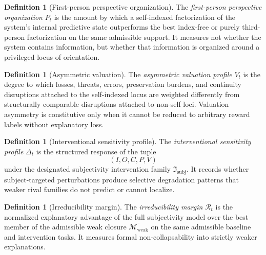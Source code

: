 \documentclass[11pt,a4paper]{article}
\theoremstyle{definition}
\newtheorem{definition}[theorem]{Definition}
\newcommand{\WeakFam}{\mathcal{M}_{\mathrm{weak}}}
\newcommand{\WeakClosure}{\overline{\WeakFam}}
\newcommand{\IntervFam}{\mathfrak{I}_{\mathrm{subj}}}
\newcommand{\SelfIndex}{I}
\newcommand{\OwnField}{O}
\newcommand{\ContField}{C}
\newcommand{\Persp}{P}
\newcommand{\ValAsym}{V}
\newcommand{\IntervProf}{\Delta}
\newcommand{\Irred}{\mathcal{R}}
\begin{document}
\begin{definition}[First-person perspective organization]\label{def:perspective}
The \emph{first-person perspective organization} $\Persp_t$ is the amount by which a self-indexed factorization of the system's internal predictive state outperforms the best index-free or purely third-person factorization on the same admissible support. It measures not whether the system contains information, but whether that information is organized around a privileged locus of orientation.
\end{definition}

\begin{definition}[Asymmetric valuation]\label{def:valuation}
The \emph{asymmetric valuation profile} $\ValAsym_t$ is the degree to which losses, threats, errors, preservation burdens, and continuity disruptions attached to the self-indexed locus are weighted differently from structurally comparable disruptions attached to non-self loci. Valuation asymmetry is constitutive only when it cannot be reduced to arbitrary reward labels without explanatory loss.
\end{definition}

\begin{definition}[Interventional sensitivity profile]\label{def:interv}
The \emph{interventional sensitivity profile} $\IntervProf_t$ is the structured response of the tuple
\[
(\SelfIndex,\OwnField,\ContField,\Persp,\ValAsym)
\]
under the designated subjectivity intervention family $\IntervFam$. It records whether subject-targeted perturbations produce selective degradation patterns that weaker rival families do not predict or cannot localize.
\end{definition}

\begin{definition}[Irreducibility margin]\label{def:irred}
The \emph{irreducibility margin} $\Irred_t$ is the normalized explanatory advantage of the full subjectivity model over the best member of the admissible weak closure $\WeakClosure$ on the same admissible baseline and intervention tasks. It measures formal non-collapsability into strictly weaker explanations.
\end{definition}
\end{document}
